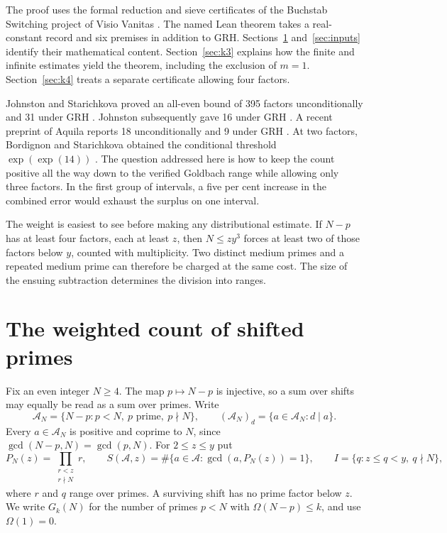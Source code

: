 \documentclass[11pt]{article}
\theoremstyle{remark}\newtheorem{remark}[theorem]{Remark}
\begin{document}
The proof uses the formal reduction and sieve certificates of the Buchstab Switching project of Visio Vanitas \cite{Repo}. The named Lean theorem takes a real-constant record and six premises in addition to GRH. Sections~\ref{sec:switch} and~\ref{sec:inputs} identify their mathematical content. Section~\ref{sec:k3} explains how the finite and infinite estimates yield the theorem, including the exclusion of $m=1$. Section~\ref{sec:k4} treats a separate certificate allowing four factors.

Johnston and Starichkova proved an all-even bound of 395 factors unconditionally and 31 under GRH \cite[Theorems 1.3--1.4]{JS}. Johnston subsequently gave 16 under GRH \cite[Theorem 2]{Johnston}. A recent preprint of Aquila reports 18 unconditionally and 9 under GRH \cite{Aquila}. At two factors, Bordignon and Starichkova obtained the conditional threshold $\exp(\exp(14))$ \cite{BS}. The question addressed here is how to keep the count positive all the way down to the verified Goldbach range while allowing only three factors. In the first group of intervals, a five per cent increase in the combined error would exhaust the surplus on one interval.

The weight is easiest to see before making any distributional estimate. If $N-p$ has at least four factors, each at least $z$, then $N\le zy^3$ forces at least two of those factors below $y$, counted with multiplicity. Two distinct medium primes and a repeated medium prime can therefore be charged at the same cost. The size of the ensuing subtraction determines the division into ranges.

\section{The weighted count of shifted primes}\label{sec:switch}

Fix an even integer $N\ge4$. The map $p\mapsto N-p$ is injective, so a sum
over shifts may equally be read as a sum over primes. Write
\[
 \mathcal A_N=\{N-p:p<N,\ p\text{ prime},\ p\nmid N\},\qquad
 (\mathcal A_N)_d=\{a\in \mathcal A_N:d\mid a\}.
\]
Every $a\in \mathcal A_N$ is positive and coprime to $N$, since
$\gcd(N-p,N)=\gcd(p,N)$. For $2\le z\le y$ put
\[
 P_N(z)=\prod_{\substack{r<z\\r\nmid N}} r,\qquad
 S(\mathcal A,z)=\#\{a\in\mathcal A:\gcd(a,P_N(z))=1\},\qquad
 I=\{q:z\le q<y,\ q\nmid N\},
\]
where $r$ and $q$ range over primes. A surviving shift has no prime
factor below $z$. We write $G_k(N)$ for the number of primes $p<N$ with
$\Omega(N-p)\le k$, and use $\Omega(1)=0$.
\end{document}
